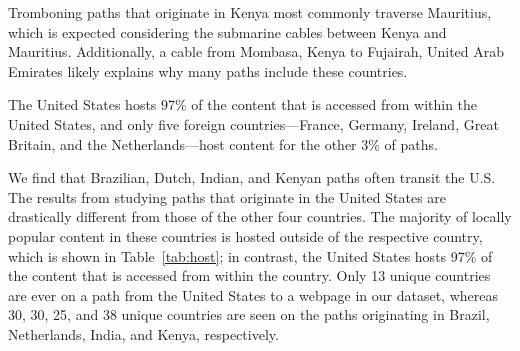 Tromboning paths that originate in Kenya most commonly traverse Mauritius,
which is expected considering the submarine cables between Kenya and
Mauritius.  Additionally, a cable from Mombasa,
Kenya to Fujairah, United Arab Emirates likely explains why many
paths include these countries. 


\begin{finding}
The United States hosts 97\% of the content that is accessed from within the United States, and only five foreign countries---France, Germany, Ireland, Great Britain, and the Netherlands---host content for the other 3\% of paths.
\end{finding}
\noindent

We find that Brazilian, Dutch, Indian, and Kenyan paths
often transit the U.S. The results from
studying paths that originate in the United States are drastically different from
those
of the other four countries.  The majority of locally popular content in these countries
is hosted outside of the respective country, which is shown in Table~\ref{tab:host}; in contrast, the United States hosts
97\% of the
content that is accessed from within the country.  Only 13 unique countries
are ever on a path from the United States to a webpage in our dataset, whereas 30, 30, 25, and 38 unique countries are seen on the paths
originating in Brazil, Netherlands, India, and Kenya, respectively.







